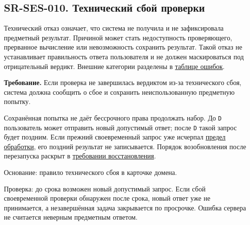 \documentclass[12pt,a4paper]{article}
\begin{document}
\subsection{SR-SES-010. Технический сбой проверки}\label{sr-ses-010-ux442ux435ux445ux43dux438ux447ux435ux441ux43aux438ux439-ux441ux431ux43eux439-ux43fux440ux43eux432ux435ux440ux43aux438}

\hypertarget{sr-ses-010-технический-сбой-проверки}{}

Технический отказ означает, что система не получила и не зафиксировала предметный результат. Причиной может стать недоступность проверяющего, прерванное вычисление или невозможность сохранить результат. Такой отказ не устанавливает правильность ответа пользователя и не должен маскироваться под отрицательный вердикт. Внешние категории разделены в \href{../07_\%D0\%9F\%D1\%80\%D0\%BE\%D0\%B3\%D1\%80\%D0\%B0\%D0\%BC\%D0\%BC\%D0\%BD\%D1\%8B\%D0\%B5_\%D1\%82\%D1\%80\%D0\%B5\%D0\%B1\%D0\%BE\%D0\%B2\%D0\%B0\%D0\%BD\%D0\%B8\%D1\%8F/DOC-06.2_\%D0\%A1\%D0\%B5\%D1\%81\%D1\%81\%D0\%B8\%D0\%B8_\%D0\%B7\%D0\%B0\%D0\%B4\%D0\%B0\%D1\%87_\%D0\%B8_\%D0\%BF\%D0\%BB\%D0\%B0\%D0\%BD\%D0\%B8\%D1\%80\%D0\%BE\%D0\%B2\%D1\%89\%D0\%B8\%D0\%BA.pdf\#nameddest=\%D0\%BA\%D0\%BE\%D0\%B4\%D1\%8B-\%D0\%B8-\%D0\%BF\%D1\%80\%D0\%B5\%D0\%B4\%D1\%81\%D1\%82\%D0\%B0\%D0\%B2\%D0\%BB\%D0\%B5\%D0\%BD\%D0\%B8\%D0\%B5-\%D0\%BE\%D1\%88\%D0\%B8\%D0\%B1\%D0\%BE\%D0\%BA}{таблице ошибок}.

\textbf{Требование.} Если проверка не завершилась вердиктом из-за технического сбоя, система должна сообщить о сбое и сохранить неиспользованную предметную попытку.

Сохранённая попытка не даёт бессрочного права продолжать набор. До \texttt{D} пользователь может отправить новый допустимый ответ; после \texttt{D} такой запрос будет поздним. Если прежний своевременный запрос уже исчерпал \hyperref[sr-ses-012-ux43eux433ux440ux430ux43dux438ux447ux435ux43dux43dux430ux44f-ux434ux43bux438ux442ux435ux43bux44cux43dux43eux441ux442ux44c-ux43eux431ux440ux430ux431ux43eux442ux43aux438]{предел обработки}, его поздний результат не записывается. Порядок возобновления после перезапуска раскрыт в \hyperref[sr-ses-013-ux432ux43eux441ux441ux442ux430ux43dux43eux432ux43bux435ux43dux438ux435-ux43fux440ux438ux43dux44fux442ux43eux433ux43e-ux43eux442ux432ux435ux442ux430]{требовании восстановления}.

Основание: правило технического сбоя в карточке домена.

Проверка: до срока возможен новый допустимый запрос. Если сбой своевременной проверки обнаружен после срока, новый ответ уже не принимается, а незавершённая задача закрывается по просрочке. Ошибка сервера не считается неверным предметным ответом.
\end{document}
